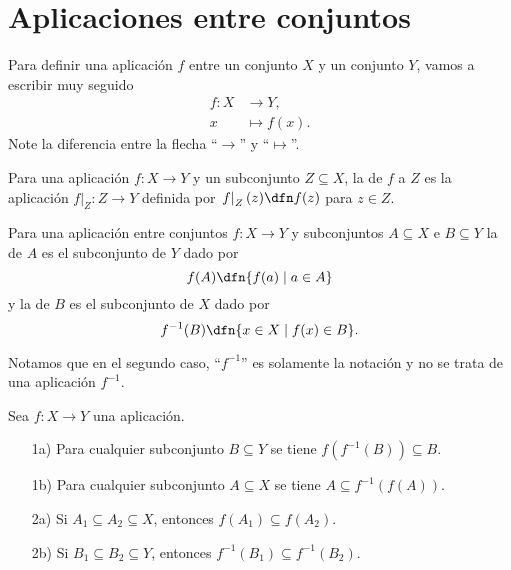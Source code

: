 
\section{Aplicaciones entre conjuntos}

Para definir una aplicación $f$ entre un conjunto $X$ y un conjunto $Y$, vamos a
escribir muy seguido
\begin{align*}
  f\colon X & \to Y,\\
  x & \mapsto f (x).
\end{align*}
Note la diferencia entre la flecha ``$\to$'' y ``$\mapsto$''.

\begin{definicion}
  Para una aplicación $f\colon X\to Y$ y un subconjunto $Z \subseteq X$,
  la  de $f$ a $Z$ es la aplicación
  $\left.f\right|_Z\colon Z\to Y$ definida por $\left.f\right|_Z (z) \dfn f (z)$
  para $z\in Z$.
\end{definicion}

\begin{definicion}
  \label{def:imagen-y-preimagen-de-conjunto}
  Para una aplicación entre conjuntos $f\colon X\to Y$ y subconjuntos
  $A \subseteq X$ e $B \subseteq Y$ la  de $A$ es el subconjunto de
  $Y$ dado por
  $$f (A) \dfn \{ f (a) \mid a \in A \}$$
  y la  de $B$ es el subconjunto de $X$ dado por
  $$f^{-1} (B) \dfn \{ x \in X \mid f (x) \in B \}.$$
\end{definicion}

Notamos que en el segundo caso, ``$f^{-1}$'' es solamente la notación y no se
trata de una aplicación $f^{-1}$.

\begin{observacionejerc}
  Sea $f\colon X\to Y$ una aplicación.

  \begin{enumerate}
  \item[1a)] Para cualquier subconjunto $B \subseteq Y$ se tiene
    $f (f^{-1} (B)) \subseteq B$.

  \item[1b)] Para cualquier subconjunto $A \subseteq X$ se tiene
    $A \subseteq f^{-1} (f (A))$.

  \item[2a)] Si $A_1 \subseteq A_2 \subseteq X$, entonces
    $f (A_1) \subseteq f (A_2)$.

  \item[2b)] Si $B_1 \subseteq B_2 \subseteq Y$, entonces
    $f^{-1} (B_1) \subseteq f^{-1} (B_2)$. \qedhere
  \end{enumerate}
\end{observacionejerc}

